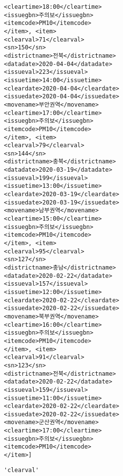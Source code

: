 \documentclass[11pt]{article}
\makeatletter
\newcommand{\boxspacing}{\kern\kvtcb@left@rule\kern\kvtcb@boxsep}
\newcommand{\prompt}[4]{
        {\ttfamily\llap{{\color{#2}[#3]:\hspace{3pt}#4}}\vspace{-\baselineskip}}
    }
\makeatother
\begin{document}
\begin{Verbatim}[commandchars=\\\{\}]
<cleartime>18:00</cleartime>
<issuegbn>주의보</issuegbn>
<itemcode>PM10</itemcode>
</item>, <item>
<clearval>71</clearval>
<sn>150</sn>
<districtname>전북</districtname>
<datadate>2020-04-04</datadate>
<issueval>223</issueval>
<issuetime>14:00</issuetime>
<cleardate>2020-04-04</cleardate>
<issuedate>2020-04-04</issuedate>
<movename>부안권역</movename>
<cleartime>17:00</cleartime>
<issuegbn>주의보</issuegbn>
<itemcode>PM10</itemcode>
</item>, <item>
<clearval>79</clearval>
<sn>144</sn>
<districtname>충북</districtname>
<datadate>2020-03-19</datadate>
<issueval>199</issueval>
<issuetime>13:00</issuetime>
<cleardate>2020-03-19</cleardate>
<issuedate>2020-03-19</issuedate>
<movename>남부권역</movename>
<cleartime>15:00</cleartime>
<issuegbn>주의보</issuegbn>
<itemcode>PM10</itemcode>
</item>, <item>
<clearval>95</clearval>
<sn>127</sn>
<districtname>충남</districtname>
<datadate>2020-02-22</datadate>
<issueval>157</issueval>
<issuetime>12:00</issuetime>
<cleardate>2020-02-22</cleardate>
<issuedate>2020-02-22</issuedate>
<movename>북부권역</movename>
<cleartime>16:00</cleartime>
<issuegbn>주의보</issuegbn>
<itemcode>PM10</itemcode>
</item>, <item>
<clearval>91</clearval>
<sn>123</sn>
<districtname>전북</districtname>
<datadate>2020-02-22</datadate>
<issueval>159</issueval>
<issuetime>11:00</issuetime>
<cleardate>2020-02-22</cleardate>
<issuedate>2020-02-22</issuedate>
<movename>군산권역</movename>
<cleartime>17:00</cleartime>
<issuegbn>주의보</issuegbn>
<itemcode>PM10</itemcode>
</item>]
    \end{Verbatim}

            \begin{tcolorbox}[breakable, size=fbox, boxrule=.5pt, pad at break*=1mm, opacityfill=0]
\prompt{Out}{outcolor}{2}{\boxspacing}
\begin{Verbatim}[commandchars=\\\{\}]
'clearval'
\end{Verbatim}
\end{tcolorbox}
        
\end{document}
